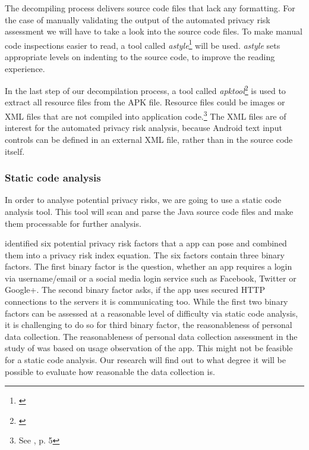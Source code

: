 \documentclass[
	a4paper,
	oneside,
	12pt,
	liststotocnumbered
]{article}
\let\cite\textcite
\begin{document}
The decompiling process delivers source code files that lack any formatting.
For the case of manually validating the output of the automated privacy risk assessment we will have to take a look into the source code files. 
To make manual code inspections easier to read, a tool called \textit{astyle}\footnote{\cite{Davidson2006}} will be used. 
\textit{astyle} sets appropriate levels on indenting to the source code, to improve the reading experience.

In the last step of our decompilation process, a tool called \textit{apktool}\footnote{\cite{Tumbleson2010}} is used to extract all resource files from the \acs{APK} file. Resource files could be images or XML files that are not compiled into application code.\footnote{See \cite{xu2013}, p. 5}
The XML files are of interest for the automated privacy risk analysis, because Android text input controls can be defined in an external XML file, rather than in the source code itself.

\subsubsection{Static code analysis}
In order to analyse potential privacy risks, we are going to use a static code analysis tool.
This tool will scan and parse the Java source code files and make them processable for further analysis.

\cite{Bruggemann2016} identified six potential privacy risk factors that a \mH app can pose and combined them into a privacy risk index equation. 
The six factors contain three binary factors.
The first binary factor is the question, whether an app requires a login via username/email or a social media login service such as Facebook, Twitter or Google+. 
The second binary factor asks, if the app uses secured \acs{HTTP} connections to the servers it is communicating too.
While the first two binary factors can be assessed at a reasonable level of difficulty via static code analysis, it is challenging to do so for third binary factor, the reasonableness of personal data collection. 
The reasonableness of personal data collection assessment in the study of \cite{Bruggemann2016} was based on usage observation of the app. This might not be feasible for a static code analysis. 
Our research will find out to what degree it will be possible to evaluate how reasonable the data collection is.
\end{document}
